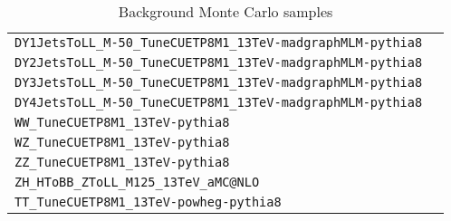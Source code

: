 \begin{table}[htbp]%
    \caption{Background Monte Carlo samples\label{tab:bg_mcsamples}}
    \begin{tabular}{lc}%
      \hline
      {\texttt{DY1JetsToLL\_M-50\_TuneCUETP8M1\_13TeV-madgraphMLM-pythia8}} \\
      {\texttt{DY2JetsToLL\_M-50\_TuneCUETP8M1\_13TeV-madgraphMLM-pythia8}} \\
      {\texttt{DY3JetsToLL\_M-50\_TuneCUETP8M1\_13TeV-madgraphMLM-pythia8}} \\
      {\texttt{DY4JetsToLL\_M-50\_TuneCUETP8M1\_13TeV-madgraphMLM-pythia8}} \\
      {\texttt{WW\_TuneCUETP8M1\_13TeV-pythia8}} \\
      {\texttt{WZ\_TuneCUETP8M1\_13TeV-pythia8}} \\
      {\texttt{ZZ\_TuneCUETP8M1\_13TeV-pythia8}} \\
       {\texttt{ZH\_HToBB\_ZToLL\_M125\_13TeV\_aMC@NLO}} \\
      {\texttt{TT\_TuneCUETP8M1\_13TeV-powheg-pythia8}} \\

\end{tabular}
\end{table}
